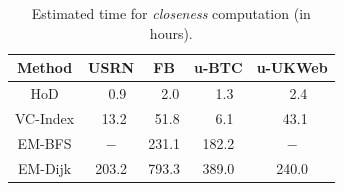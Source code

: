 \documentclass{sig-alternate}
\def\tblcapup{\vspace{-0mm}}
\def\tblcapdown{\vspace{-3mm}}
\def\tblup{\vspace{2mm}}
\begin{document}
\begin{sloppy}


\begin{table}[t]
\centering
\vspace{-2mm}
\begin{small}
\caption{Estimated time for {\em closeness} computation (in hours).}
\label{tbl:exp-close}
\tblup
\begin{tabular}{|c|c|c|c|c|}
\hline
{\bf Method} &   {\bf USRN} & {\bf FB} &  {\bf u-BTC} & {\bf u-UKWeb} \\  \hline
HoD & $\;\,\;\,$0.9 & $\;\,\;\,$2.0 & $\;\,\;\,$1.3 & $\;\,\;\,$2.4 \\ \hline
VC-Index & $\;\,$13.2 & $\;\,$51.8 & $\;\,\;\,$6.1 & $\;\,$43.1 \\ \hline
EM-BFS & $-$ & 231.1 & 182.2 & $-$ \\ \hline
EM-Dijk & 203.2 & 793.3 & 389.0 & 240.0 \\ \hline
\end{tabular}
\tblcapdown
\end{small}
\end{table}




\end{sloppy}
\end{document}
